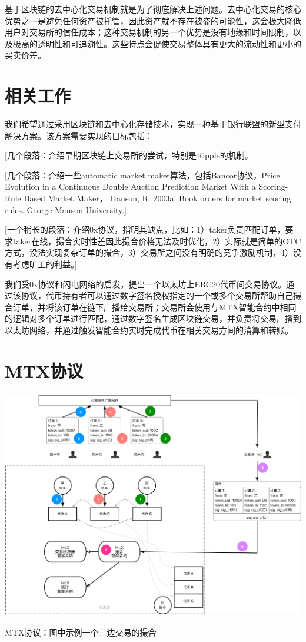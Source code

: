 \documentclass[UTF8,nofonts]{ctexart}
\makeatletter
\newenvironment{figurehere}
  {\def\@captype{figure}}
  {}
\makeatother
\begin{document}
基于区块链的去中心化交易机制就是为了彻底解决上述问题。去中心化交易的核心优势之一是避免任何资产被托管，因此资产就不存在被盗的可能性，这会极大降低用户对交易所的信任成本；这种交易机制的另一个优势是没有地缘和时间限制，以及极高的透明性和可追溯性。这些特点会促使交易整体具有更大的流动性和更小的买卖价差。

\section{相关工作\label{sec:existingworks}}
我们希望通过采用区块链\cite{nakamoto2008bitcoin,swan2015blockchain}和去中心化存储技术，实现一种基于银行联盟的新型支付解决方案。该方案需要实现的目标包括：

[几个段落：介绍早期区块链上交易所的尝试，特别是Ripple的机制。


[几个段落：介绍一些automatic market maker算法，包括Bancor协议，{Price Evolution in a Continuous Double Auction Prediction Market With a Scoring-Rule Based Market Maker}， {Hanson, R. 2003a. Book orders for market scoring rules. George Manson University.}]

[一个稍长的段落：介绍0x协议，指明其缺点，比如：1）taker负责匹配订单，要求taker在线，撮合实时性差因此撮合价格无法及时优化，2）实际就是简单的OTC方式，没法实现复杂订单的撮合，3）交易所之间没有明确的竞争激励机制，4）没有考虑旷工的利益。]

我们受0x协议和闪电网络的启发，提出一个以太坊上ERC20代币间交易协议。通过该协议，代币持有者可以通过数字签名授权指定的一个或多个交易所帮助自己撮合订单，并将该订单在链下广播给交易所；交易所会使用与MTX智能合约中相同的逻辑对多个订单进行匹配，通过数字签名生成区块链交易，并负责将交易广播到以太坊网络，并通过触发智能合约实时完成代币在相关交易方间的清算和转账。

\section{MTX协议\label{sec:protocol}}

\begin{center}
\begin{figurehere}
\includegraphics[height=10cm]{images/mtx-protocol.png}
\caption{MTX协议：图中示例一个三边交易的撮合}
\label{fig:mtxprotocol}
\end{figurehere}
\end{center}
\end{document}
